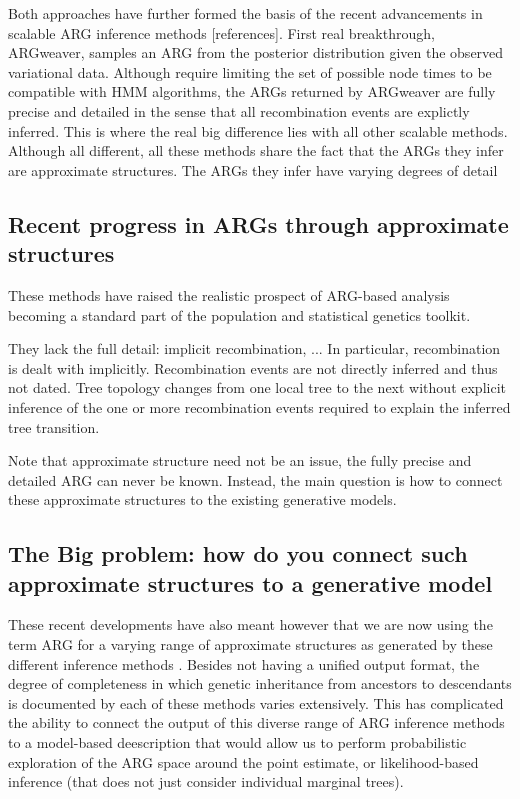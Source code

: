 \documentclass{article}
\begin{document}
Both approaches have further formed the basis of the recent advancements in 
scalable ARG inference methods [references]. 
First real breakthrough, ARGweaver, samples an ARG from the posterior distribution 
given the observed variational data. Although require limiting the set of 
possible node times to be compatible with HMM algorithms, the ARGs returned 
by ARGweaver are fully precise and detailed in the sense that all 
recombination events are explictly inferred. 
This is where the real big difference lies with all other scalable methods. 
Although all different, all these methods share the fact that the ARGs they infer 
are approximate structures. The ARGs they infer have varying degrees of detail



\subsection{Recent progress in ARGs through approximate structures}




These methods
have raised the realistic prospect of ARG-based analysis becoming a standard 
part of the population and statistical genetics toolkit.

They lack the full detail: implicit recombination, ...
In particular, recombination is dealt with implicitly. Recombination events are 
not directly inferred and thus not dated. Tree topology changes from one local 
tree to the next without explicit inference of the one or more recombination 
events required to explain the inferred tree transition.

Note that approximate structure need not be an issue, the fully precise and detailed 
ARG can never be known. Instead, the main question is how to connect these 
approximate structures to the existing generative models.

\subsection{The Big problem: how do you connect such approximate structures to a generative model} 

These recent developments have also meant however that
we are now using the term ARG for a varying range of approximate structures 
as generated by these different inference methods \citep{wong_a-general_2023}. 
Besides not having a unified output format, the degree of completeness 
in which genetic inheritance from ancestors to 
descendants is documented by each of these methods varies extensively.
This has complicated the ability to connect the output of this diverse range of 
ARG inference methods to a model-based deescription that would allow us to perform  
probabilistic exploration of the ARG space around the point estimate, 
or likelihood-based inference (that does not just consider individual marginal trees).
\end{document}
